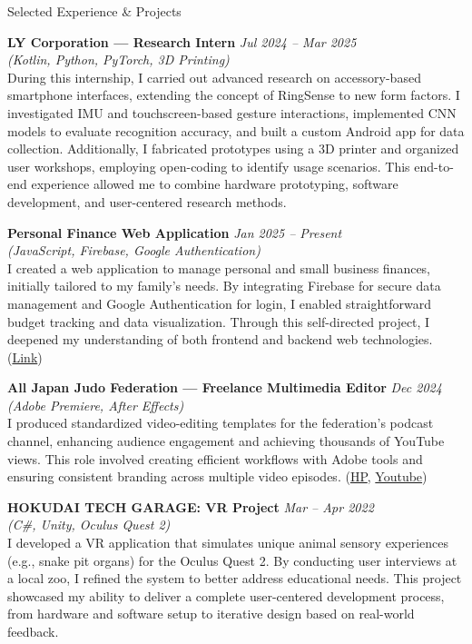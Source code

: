 \documentclass[
    11pt, %
]{resume} %
\begin{document}
\begin{rSection}{Selected Experience \& Projects}

\textbf{LY Corporation --- Research Intern} \hfill \textit{Jul 2024 -- Mar 2025} \\
\textit{(Kotlin, Python, PyTorch, 3D Printing)} \\
During this internship, I carried out advanced research on accessory-based smartphone interfaces, extending the concept of RingSense to new form factors. I investigated IMU and touchscreen-based gesture interactions, implemented CNN models to evaluate recognition accuracy, and built a custom Android app for data collection. Additionally, I fabricated prototypes using a 3D printer and organized user workshops, employing open-coding to identify usage scenarios. This end-to-end experience allowed me to combine hardware prototyping, software development, and user-centered research methods.

\textbf{Personal Finance Web Application} \hfill \textit{Jan 2025 -- Present} \\
\textit{(JavaScript, Firebase, Google Authentication)} \\
I created a web application to manage personal and small business finances, initially tailored to my family's needs. By integrating Firebase for secure data management and Google Authentication for login, I enabled straightforward budget tracking and data visualization. Through this self-directed project, I deepened my understanding of both frontend and backend web technologies. (\href{https://budget-app-db-225db.web.app/}{Link})

\textbf{All Japan Judo Federation --- Freelance Multimedia Editor} \hfill \textit{Dec 2024} \\
\textit{(Adobe Premiere, After Effects)} \\
I produced standardized video-editing templates for the federation's podcast channel, enhancing audience engagement and achieving thousands of YouTube views. This role involved creating efficient workflows with Adobe tools and ensuring consistent branding across multiple video episodes. (\href{https://ltd.japan-judo.org/ajjf-podcast/}{HP}, \href{https://www.youtube.com/playlist?list=PLchwykcjHz9CD9bmAjxs1Xiej3CS-0XqD}{Youtube})

\textbf{HOKUDAI TECH GARAGE: VR Project} \hfill \textit{Mar -- Apr 2022} \\
\textit{(C\#, Unity, Oculus Quest 2)} \\
I developed a VR application that simulates unique animal sensory experiences (e.g., snake pit organs) for the Oculus Quest 2. By conducting user interviews at a local zoo, I refined the system to better address educational needs. This project showcased my ability to deliver a complete user-centered development process, from hardware and software setup to iterative design based on real-world feedback.


\end{rSection}
\end{document}
